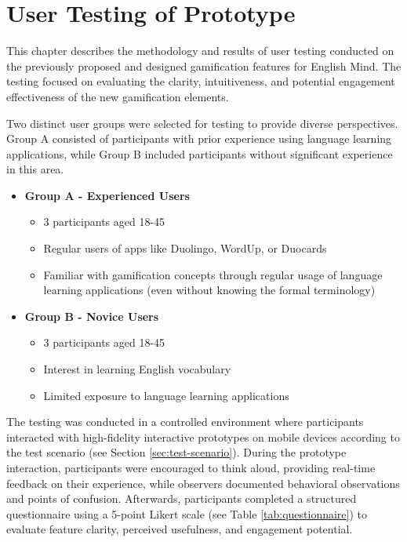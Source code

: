\chapter{User Testing of Prototype}

This chapter describes the methodology and results of user testing conducted on the previously proposed and designed gamification features for English Mind. The testing focused on evaluating the clarity, intuitiveness, and potential engagement effectiveness of the new gamification elements.

Two distinct user groups were selected for testing to provide diverse perspectives. Group A consisted of participants with prior experience using language learning applications, while Group B included participants without significant experience in this area.
\begin{itemize}
    \item \textbf{Group A - Experienced Users}
    \begin{itemize}
        \item 3 participants aged 18-45
        \item Regular users of apps like Duolingo, WordUp, or Duocards
        \item Familiar with gamification concepts through regular usage of language learning applications (even without knowing the formal terminology)
    \end{itemize}

    \item \textbf{Group B - Novice Users}
    \begin{itemize}
        \item 3 participants aged 18-45
        \item Interest in learning English vocabulary
        \item Limited exposure to language learning applications
    \end{itemize}
\end{itemize}

The testing was conducted in a controlled environment where participants interacted with high-fidelity interactive prototypes on mobile devices according to the test scenario (see Section \ref{sec:test-scenario}). During the prototype interaction, participants were encouraged to think aloud, providing real-time feedback on their experience, while observers documented behavioral observations and points of confusion. Afterwards, participants completed a structured questionnaire using a 5-point Likert scale (see Table \ref{tab:questionnaire}) to evaluate feature clarity, perceived usefulness, and engagement potential.

